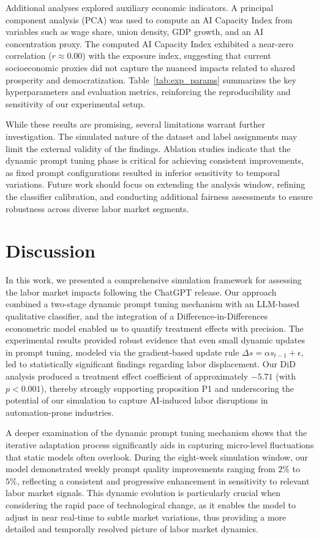 \documentclass{article} %
\begin{document}
Additional analyses explored auxiliary economic indicators. A principal component analysis (PCA) was used to compute an AI Capacity Index from variables such as wage share, union density, GDP growth, and an AI concentration proxy. The computed AI Capacity Index exhibited a near-zero correlation (\( r \approx 0.00 \)) with the exposure index, suggesting that current socioeconomic proxies did not capture the nuanced impacts related to shared prosperity and democratization. Table~\ref{tab:exp_params} summarizes the key hyperparameters and evaluation metrics, reinforcing the reproducibility and sensitivity of our experimental setup.

While these results are promising, several limitations warrant further investigation. The simulated nature of the dataset and label assignments may limit the external validity of the findings. Ablation studies indicate that the dynamic prompt tuning phase is critical for achieving consistent improvements, as fixed prompt configurations resulted in inferior sensitivity to temporal variations. Future work should focus on extending the analysis window, refining the classifier calibration, and conducting additional fairness assessments to ensure robustness across diverse labor market segments.

\section{Discussion}
In this work, we presented a comprehensive simulation framework for assessing the labor market impacts following the ChatGPT release. Our approach combined a two-stage dynamic prompt tuning mechanism with an LLM-based qualitative classifier, and the integration of a Difference-in-Differences econometric model enabled us to quantify treatment effects with precision. The experimental results provided robust evidence that even small dynamic updates in prompt tuning, modeled via the gradient-based update rule \( \Delta s = \alpha s_{t-1} + \epsilon \), led to statistically significant findings regarding labor displacement. Our DiD analysis produced a treatment effect coefficient of approximately \(-5.71\) (with \(p < 0.001\)), thereby strongly supporting proposition P1 and underscoring the potential of our simulation to capture AI-induced labor disruptions in automation-prone industries.

A deeper examination of the dynamic prompt tuning mechanism shows that the iterative adaptation process significantly aids in capturing micro-level fluctuations that static models often overlook. During the eight-week simulation window, our model demonstrated weekly prompt quality improvements ranging from \(2\%\) to \(5\%\), reflecting a consistent and progressive enhancement in sensitivity to relevant labor market signals. This dynamic evolution is particularly crucial when considering the rapid pace of technological change, as it enables the model to adjust in near real-time to subtle market variations, thus providing a more detailed and temporally resolved picture of labor market dynamics.
\end{document}
